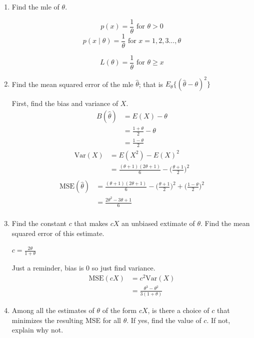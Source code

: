 \documentclass{tufte-book}
\newcommand{\Var}{\mathrm{Var}}
\newcommand{\MSE}{\mathrm{MSE}}
\theoremstyle{mytheoremstyle}
\theoremstyle{mylemstyle}
\theoremstyle{mydefstyle}
\begin{document}
\begin{enumerate}

\item Find the mle of $\theta$.

\[ p(x) = \frac{1}{\theta} \text{ for }{ \theta > 0} \]
\[ p(x \mid \theta) = \frac{1}{\theta} \text{ for } x=1,2,3...,\theta \]

\[ L(\theta) = \frac{1}{\theta} \text{ for }\theta \geq x \]

\item Find the mean squared error of the mle $\hat{\theta}$; that is $E_\theta\{(\hat{\theta} - \theta)^2\}$

First, find the bias and variance of $X$.
\begin{align*}
B(\hat{\theta}) &= E(X) - \theta\\
&= \frac{1+\theta}{2} - \theta\\
&= \frac{1-\theta}{2}
\end{align*}
\begin{align*}
\Var(X) &= E(X^2) - E(X)^2\\
&= \frac{(\theta+1)(2\theta+1)}{6} - \Big(\frac{\theta + 1}{2}\Big)^2\\
\end{align*}
\begin{align*}
\MSE(\hat{\theta}) &= \frac{(\theta+1)(2\theta+1)}{6} - \Big(\frac{\theta + 1}{2}\Big)^2 + \Big(\frac{1-\theta}{2}\Big)^2\\
&= \frac{2\theta^2 - 3\theta +1}{6}\\
\end{align*}

\item Find the constant $c$ that makes $cX$ an unbiased extimate of $\theta$.  Find the mean squared error of this estimate.

$c = \frac{2 \theta}{1 + \theta}$

Just  a reminder, bias is $0$ so just find variance.
\begin{align*}
\MSE(cX) &= c^2\Var(X)\\
&=  \frac{\theta^3 -\theta^2}{3(1+\theta)}
\end{align*}

\item Among all the estimates of $\theta$ of the form $cX$, is there a choice of $c$ that minimizes the resulting MSE for all $\theta$.  If yes, find the value of $c$. If not, explain why not.


\end{enumerate}
\end{document}
